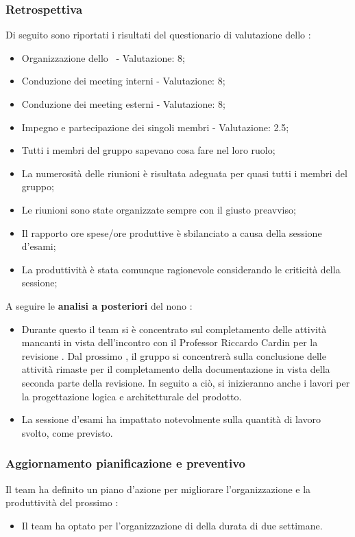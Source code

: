 \subsubsection{Retrospettiva}

\par Di seguito sono riportati i risultati del questionario di valutazione dello :
\begin{itemize}
  \item Organizzazione dello \ - Valutazione: 8;
  \item Conduzione dei meeting interni - Valutazione: 8;
  \item Conduzione dei meeting esterni - Valutazione: 8;
  \item Impegno e partecipazione dei singoli membri - Valutazione: 2.5;
  \item Tutti i membri del gruppo sapevano cosa fare nel loro ruolo;
  \item La numerosità delle riunioni è risultata adeguata per quasi tutti i membri del gruppo;
  \item Le riunioni sono state organizzate sempre con il giusto preavviso;
  \item Il rapporto ore spese/ore produttive è sbilanciato a causa della sessione d'esami;
  \item La produttività è stata comunque ragionevole considerando le criticità della sessione;
\end{itemize}

\vspace{0.5\baselineskip}
\par A seguire le \textbf{analisi a posteriori} del nono :
\begin{itemize}
  \item Durante questo  il team si è concentrato sul completamento delle attività mancanti in vista dell'incontro con il Professor Riccardo Cardin per la revisione \RTB. Dal prossimo , il gruppo si concentrerà sulla conclusione delle attività rimaste per il completamento della documentazione in vista della seconda parte della revisione. In seguito a ciò, si inizieranno anche i lavori per la progettazione logica e architetturale del prodotto.
  \item La sessione d'esami ha impattato notevolmente sulla quantità di lavoro svolto, come previsto.
\end{itemize}

\subsubsection{Aggiornamento pianificazione e preventivo}
\par Il team ha definito un piano d'azione per migliorare l'organizzazione e la produttività del prossimo :
\begin{itemize}
  \item Il team ha optato per l'organizzazione di  della durata di due settimane.
\end{itemize}

